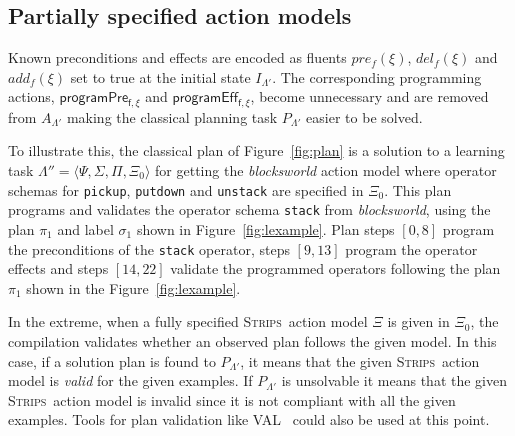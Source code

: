 \documentclass[letterpaper]{article} %
\newcommand{\tup}[1]{{\langle #1 \rangle}}
\newcommand{\strips}{\textsc{Strips}}     %
\begin{document}
\subsection{Partially specified action models}
Known preconditions and effects are encoded as fluents $pre_f(\xi)$, $del_f(\xi)$ and $add_f(\xi)$ set to true at the initial state $I_{\Lambda'}$. The corresponding programming actions, $\mathsf{programPre_{f,\xi}}$ and $\mathsf{programEff_{f,\xi}}$, become unnecessary and are removed from $A_{\Lambda'}$ making the classical planning task $P_{\Lambda'}$ easier to be solved.

To illustrate this, the classical plan of Figure~\ref{fig:plan} is a solution to a learning task $\Lambda''=\tup{\Psi,\Sigma,\Pi,\Xi_0}$ for getting the {\em blocksworld} action model where operator schemas for {\tt\small pickup}, {\tt\small putdown} and {\tt\small unstack} are specified in $\Xi_0$. This plan programs and validates the operator schema {\tt\small stack} from {\em blocksworld}, using the plan $\pi_1$ and label $\sigma_1$ shown in Figure~\ref{fig:lexample}. Plan steps $[0,8]$ program the preconditions of the {\tt\small stack} operator, steps $[9,13]$ program the operator effects and steps $[14,22]$ validate the programmed operators following the plan $\pi_1$ shown in the Figure~\ref{fig:lexample}.

In the extreme, when a fully specified \strips\ action model $\Xi$ is given in $\Xi_0$, the compilation validates whether an observed plan follows the given model. In this case, if a solution plan is found to $P_{\Lambda'}$, it means that the given \strips\ action model is {\em valid} for the given examples. If $P_{\Lambda'}$ is unsolvable it means that the given \strips\ action model is invalid since it is not compliant with all the given examples. Tools for plan validation like VAL~\cite{howey2004val} could also be used at this point.
\end{document}

